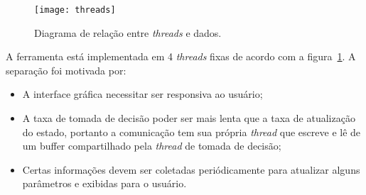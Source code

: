 \begin{figure}[H]
  \centering
  \texttt{[image: threads]}
  \caption{Diagrama de relação entre \textit{threads} e
  dados.}\label{fig:arch-threads}
\end{figure}

A ferramenta está implementada em 4 \textit{threads} fixas de acordo com a
figura~\ref{fig:arch-threads}.  A separação foi motivada por:

\begin{itemize}
  \item A interface gráfica necessitar ser responsiva ao usuário;
  \item A taxa de tomada de decisão poder ser mais lenta que a taxa de
    atualização do estado, portanto a comunicação tem sua própria
    \textit{thread} que escreve e lê de um buffer compartilhado pela
    \textit{thread} de tomada de decisão;
  \item Certas informações devem ser coletadas periódicamente para atualizar
    alguns parâmetros e exibidas para o usuário.
\end{itemize}


